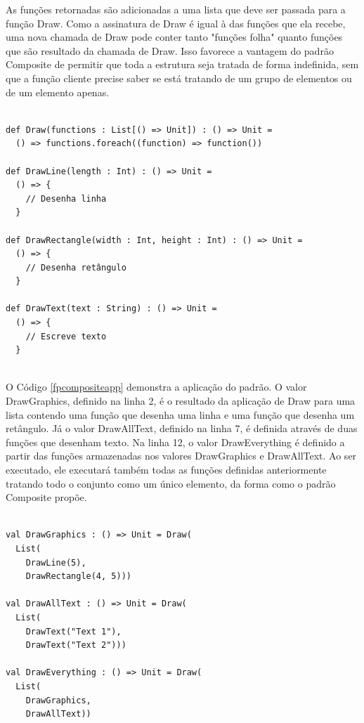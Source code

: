 As funções retornadas são adicionadas a uma 
lista que deve ser passada para a função Draw. 
Como a assinatura de Draw é igual à das funções 
que ela recebe, uma nova chamada de Draw pode 
conter tanto "funções folha" quanto funções 
que são resultado da chamada de Draw. Isso 
favorece a vantagem do padrão Composite de 
permitir que toda a estrutura seja tratada 
de forma indefinida, sem que a função 
cliente precise saber se está tratando de um 
grupo de elementos ou de um elemento apenas. 

\begin{lstlisting}[caption={Composite Funcional.},label=fpcomposite]
    
def Draw(functions : List[() => Unit]) : () => Unit =
  () => functions.foreach((function) => function())

def DrawLine(length : Int) : () => Unit =
  () => {
    // Desenha linha
  }

def DrawRectangle(width : Int, height : Int) : () => Unit =
  () => {
    // Desenha retângulo
  }

def DrawText(text : String) : () => Unit =
  () => {
    // Escreve texto
  }
    
\end{lstlisting}

O Código \ref{fpcompositeapp} demonstra a 
aplicação do padrão. O valor DrawGraphics, 
definido na linha 2, é o resultado da aplicação 
de Draw para uma lista contendo uma função que 
desenha uma linha e uma função que desenha 
um retângulo. Já o valor DrawAllText, definido 
na linha 7, é definida através de duas funções 
que desenham texto. Na linha 12, o valor 
DrawEverything é definido a partir das funções 
armazenadas nos valores DrawGraphics e 
DrawAllText. Ao ser executado, ele executará 
também todas as funções definidas anteriormente 
tratando todo o conjunto como um único elemento, 
da forma como o padrão Composite propõe.

\begin{lstlisting}[caption={Aplicação do Composite Funcional.},label=fpcompositeapp]
    
val DrawGraphics : () => Unit = Draw(
  List(
    DrawLine(5),
    DrawRectangle(4, 5)))

val DrawAllText : () => Unit = Draw(
  List(
    DrawText("Text 1"),
    DrawText("Text 2")))

val DrawEverything : () => Unit = Draw(
  List(
    DrawGraphics,
    DrawAllText))
    
\end{lstlisting}